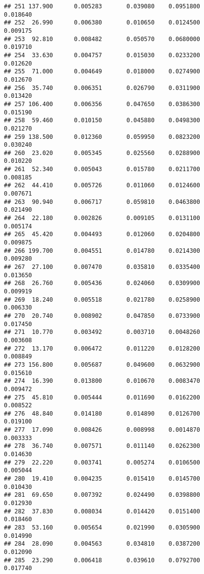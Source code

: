 \documentclass[
]{article}
\begin{document}
\begin{verbatim}
## 251 137.900      0.005283       0.039080    0.0951800          0.018640
## 252  26.990      0.006380       0.010650    0.0124500          0.009175
## 253  92.810      0.008482       0.050570    0.0680000          0.019710
## 254  33.630      0.004757       0.015030    0.0233200          0.012620
## 255  71.000      0.004649       0.018000    0.0274900          0.012670
## 256  35.740      0.006351       0.026790    0.0311900          0.013420
## 257 106.400      0.006356       0.047650    0.0386300          0.015190
## 258  59.460      0.010150       0.045880    0.0498300          0.021270
## 259 138.500      0.012360       0.059950    0.0823200          0.030240
## 260  23.020      0.005345       0.025560    0.0288900          0.010220
## 261  52.340      0.005043       0.015780    0.0211700          0.008185
## 262  44.410      0.005726       0.011060    0.0124600          0.007671
## 263  90.940      0.006717       0.059810    0.0463800          0.021490
## 264  22.180      0.002826       0.009105    0.0131100          0.005174
## 265  45.420      0.004493       0.012060    0.0204800          0.009875
## 266 199.700      0.004551       0.014780    0.0214300          0.009280
## 267  27.100      0.007470       0.035810    0.0335400          0.013650
## 268  26.760      0.005436       0.024060    0.0309900          0.009919
## 269  18.240      0.005518       0.021780    0.0258900          0.006330
## 270  20.740      0.008902       0.047850    0.0733900          0.017450
## 271  10.770      0.003492       0.003710    0.0048260          0.003608
## 272  13.170      0.006472       0.011220    0.0128200          0.008849
## 273 156.800      0.005687       0.049600    0.0632900          0.015610
## 274  16.390      0.013800       0.010670    0.0083470          0.009472
## 275  45.810      0.005444       0.011690    0.0162200          0.008522
## 276  48.840      0.014180       0.014890    0.0126700          0.019100
## 277  17.090      0.008426       0.008998    0.0014870          0.003333
## 278  36.740      0.007571       0.011140    0.0262300          0.014630
## 279  22.220      0.003741       0.005274    0.0106500          0.005044
## 280  19.410      0.004235       0.015410    0.0145700          0.010430
## 281  69.650      0.007392       0.024490    0.0398800          0.012930
## 282  37.830      0.008034       0.014420    0.0151400          0.018460
## 283  53.160      0.005654       0.021990    0.0305900          0.014990
## 284  28.090      0.004563       0.034810    0.0387200          0.012090
## 285  23.290      0.006418       0.039610    0.0792700          0.017740

\end{verbatim}
\end{document}
